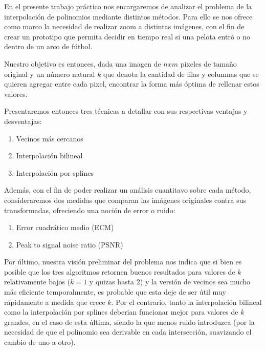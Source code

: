 En el presente trabajo práctico nos encargaremos de analizar el problema de la interpolación de polinomios mediante distintos métodos.
Para ello se nos ofrece como marco la necesidad de realizar zoom a distintas imágenes, con el fin de crear un prototipo que permita decidir en tiempo
real si una pelota entró o no dentro de un arco de fútbol.

Nuestro objetivo es entonces, dada una imagen de $n x m$ pixeles de tamaño original y un número natural $k$ que denota la cantidad de filas y
columnas que se quieren agregar entre cada pixel, encontrar la forma más óptima de rellenar estos valores.

Presentaremos entonces tres técnicas a detallar con sus respectivas ventajas y desventajas:
\begin{enumerate}
 \item Vecinos más cercanos
 \item Interpolación bilineal
 \item Interpolación por splines
\end{enumerate}

Además, con el fin de poder realizar un análisis cuantitavo sobre cada método, consideraremos dos medidas que comparan las imágenes
originales contra sus transformadas, ofreciendo una noción de error o ruido:
\begin{enumerate}
 \item Error cuadrático medio (ECM)
 \item Peak to signal noise ratio (PSNR)
\end{enumerate}

Por último, nuestra visión preliminar del problema nos indica que si bien es posible que los tres algoritmos retornen buenos resultados
para valores de $k$ relativamente bajos ($k = 1$ y quizas hasta $2$) y la versión de vecinos sea mucho más eficiente temporalmente,
es probable que esta deje de ser útil muy rápidamente a medida que crece $k$. Por el contrario, tanto la interpolación bilineal como la
interpolación por splines deberian funcionar mejor para valores de $k$ grandes, en el caso de esta última, siendo la que menos ruido introduzca
(por la necesidad de que el polinomio sea derivable en cada intersección, suavizando el cambio de uno a otro).
